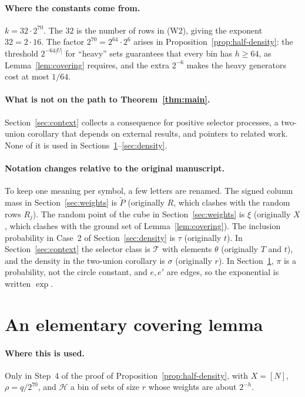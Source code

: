 \documentclass[11pt,letterpaper]{article}
\theoremstyle{definition}
\theoremstyle{remark}
\numberwithin{equation}{section}
\begin{document}
\paragraph{Where the constants come from.}
$k=32\cdot2^{70}$. The $32$ is the number of rows in (W2), giving the
exponent $32=2\cdot16$. The factor $2^{70}=2^{64}\cdot2^{6}$ arises in
Proposition~\ref{prop:half-density}: the threshold $2^{-64|U|}$ for
``heavy'' sets guarantees that every bin has $h\ge64$, as
Lemma~\ref{lem:covering} requires, and the extra $2^{-6}$ makes the heavy
generators cost at most $1/64$.

\paragraph{What is not on the path to Theorem~\ref{thm:main}.}
Section~\ref{sec:context} collects a consequence for positive selector
processes, a two-union corollary that depends on external results, and
pointers to related work. None of it is used in
Sections~\ref{sec:covering}--\ref{sec:density}.

\paragraph{Notation changes relative to the original manuscript.}
To keep one meaning per symbol, a few letters are renamed. The signed
column mass in Section~\ref{sec:weights} is $\widetilde P$ (originally
$R$, which clashes with the random rows $R_j$). The random point of the
cube in Section~\ref{sec:weights} is $\xi$ (originally $X$, which clashes
with the ground set of Lemma~\ref{lem:covering}). The inclusion
probability in Case~2 of Section~\ref{sec:density} is $\tau$
(originally $t$). In Section~\ref{sec:context} the selector class is
$\mathcal T$ with elements $\theta$ (originally $T$ and $t$), and the
density in the two-union corollary is $\sigma$ (originally $r$).
In Section~\ref{sec:covering}, $\pi$ is a probability, not the circle
constant, and $e,e'$ are edges, so the exponential is written $\exp$.

\section{An elementary covering lemma}
\label{sec:covering}

\paragraph{Where this is used.}
Only in Step~4 of the proof of Proposition~\ref{prop:half-density}, with
$X=[N]$, $\rho=q/2^{70}$, and $\mathcal H$ a bin of sets of size $r$ whose
weights are about $2^{-h}$.
\end{document}
